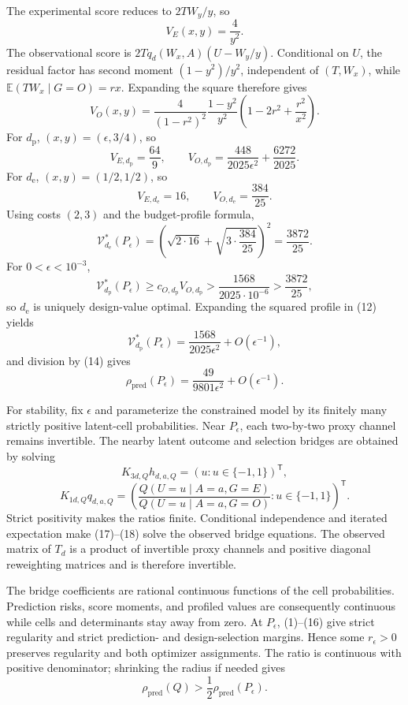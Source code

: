 The experimental score reduces to \(2TW_y/y\), so
\[
V_E(x,y)=\frac4{y^2}.                                               \tag{10}
\]
The observational score is \(2Tq_d(W_x,A)(U-W_y/y)\).  Conditional on \(U\), the residual factor has second moment \((1-y^2)/y^2\), independent of \((T,W_x)\), while \(\mathbb E(TW_x\mid G=O)=rx\).  Expanding the square therefore gives
\[
V_O(x,y)=\frac4{(1-r^2)^2}\frac{1-y^2}{y^2}
\left(1-2r^2+\frac{r^2}{x^2}\right).                              \tag{11}
\]
For \(d_{\mathrm p}\), \((x,y)=(\epsilon,3/4)\), so
\[
V_{E,d_{\mathrm p}}=\frac{64}{9},\qquad
V_{O,d_{\mathrm p}}
=\frac{448}{2025\epsilon^2}+\frac{6272}{2025}.                    \tag{12}
\]
For \(d_{\mathrm e}\), \((x,y)=(1/2,1/2)\), so
\[
V_{E,d_{\mathrm e}}=16,\qquad V_{O,d_{\mathrm e}}=\frac{384}{25}.\tag{13}
\]
Using costs \((2,3)\) and the budget-profile formula,
\[
\mathcal V_{d_{\mathrm e}}^*(P_\epsilon)
=\left(\sqrt{2\cdot16}+\sqrt{3\cdot\frac{384}{25}}\right)^2
=\frac{3872}{25}.                                                   \tag{14}
\]
For \(0<\epsilon<10^{-3}\),
\[
\mathcal V_{d_{\mathrm p}}^*(P_\epsilon)
\ge c_{O,d_{\mathrm p}}V_{O,d_{\mathrm p}}
>\frac{1568}{2025\cdot10^{-6}}>\frac{3872}{25},                   \tag{15}
\]
so \(d_{\mathrm e}\) is uniquely design-value optimal.  Expanding the squared profile in (12) yields
\[
\mathcal V_{d_{\mathrm p}}^*(P_\epsilon)
=\frac{1568}{2025\epsilon^2}+O(\epsilon^{-1}),
\]
and division by (14) gives
\[
\rho_{\mathrm{pred}}(P_\epsilon)
=\frac{49}{9801\epsilon^2}+O(\epsilon^{-1}).                      \tag{16}
\]

For stability, fix \(\epsilon\) and parameterize the constrained model by its finitely many strictly positive latent-cell probabilities.  Near \(P_\epsilon\), each two-by-two proxy channel remains invertible.  The nearby latent outcome and selection bridges are obtained by solving
\[
K_{3d,Q}h_{d,a,Q}=(u:u\in\{-1,1\})^{\mathsf T},                  \tag{17}
\]
\[
K_{1d,Q}q_{d,a,Q}
=\left(\frac{Q(U=u\mid A=a,G=E)}{Q(U=u\mid A=a,G=O)}:
u\in\{-1,1\}\right)^{\mathsf T}.                                \tag{18}
\]
Strict positivity makes the ratios finite.  Conditional independence and iterated expectation make (17)--(18) solve the observed bridge equations.  The observed matrix of \(T_d\) is a product of invertible proxy channels and positive diagonal reweighting matrices and is therefore invertible.

The bridge coefficients are rational continuous functions of the cell probabilities.  Prediction risks, score moments, and profiled values are consequently continuous while cells and determinants stay away from zero.  At \(P_\epsilon\), (1)--(16) give strict regularity and strict prediction- and design-selection margins.  Hence some \(r_\epsilon>0\) preserves regularity and both optimizer assignments.  The ratio is continuous with positive denominator; shrinking the radius if needed gives
\[
\rho_{\mathrm{pred}}(Q)>\frac12\rho_{\mathrm{pred}}(P_\epsilon).
\]
